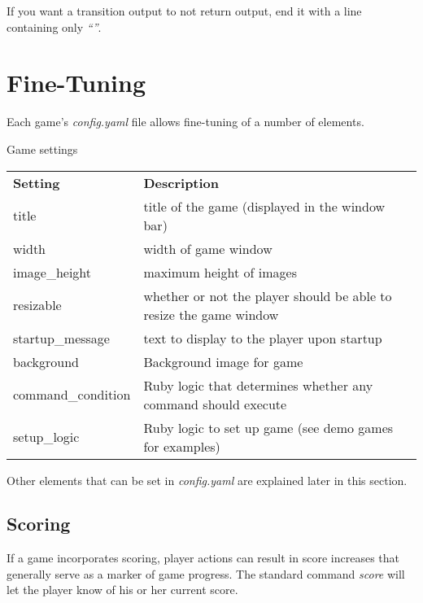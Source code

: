 \documentclass[letterpaper,10pt,english]{sphinxmanual}
\begin{document}
If you want a transition output to not return output, end it with a line containing only \emph{``''}.


\chapter{Fine-Tuning}
\label{fine_tuning::doc}\label{fine_tuning:fine-tuning}
Each game's \emph{config.yaml} file allows fine-tuning of a number of elements.

\begin{threeparttable}
\capstart\caption{Game settings}

\begin{tabulary}{\linewidth}{|L|L|}
\hline

\textbf{Setting}
 & 
\textbf{Description}
\\

title
 & 
title of the game (displayed in the window bar)
\\

width
 & 
width of game window
\\

image\_height
 & 
maximum height of images
\\

resizable
 & 
whether or not the player should be able to resize the game window
\\

startup\_message
 & 
text to display to the player upon startup
\\

background
 & 
Background image for game
\\

command\_condition
 & 
Ruby logic that determines whether any command should execute
\\

setup\_logic
 & 
Ruby logic to set up game (see demo games for examples)
\\
\hline
\end{tabulary}

\end{threeparttable}


Other elements that can be set in \emph{config.yaml} are explained later in this section.


\section{Scoring}
\label{fine_tuning:scoring}
If a game incorporates scoring, player actions can result in score increases that generally serve as a marker of game progress. The standard command \emph{score} will let the player know of his or her current score.
\end{document}

